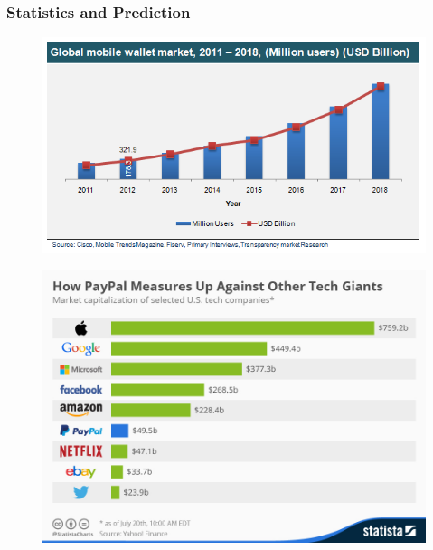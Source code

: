 \documentclass[handout]{beamer}
\begin{document}
\begin{frame}
\frametitle{Statistics and Prediction}

\begin{figure}[h]
\begin{center}
\includegraphics[scale=0.3,angle=360]{vallet4.png}
\end{center}
\end{figure}

\begin{figure}[h]
\begin{center}
\includegraphics[scale=0.2,angle=360]{vallet6.jpg}
\end{center}
\end{figure}



\end{frame}
\end{document}
